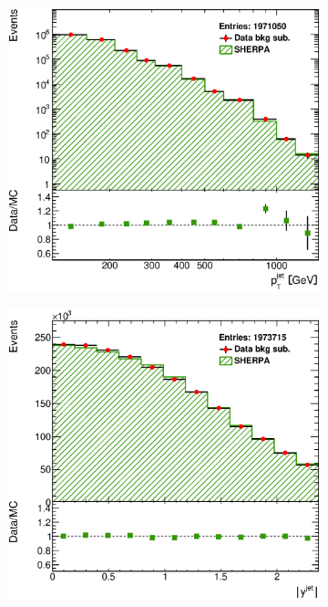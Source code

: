 \documentclass[12pt, twoside]{article}
\numberwithin{equation}{section}
\numberwithin{figure}{section}
\newenvironment{changemargin}[2]{%
\begin{list}{}{%
\setlength{\topsep}{0pt}%
\setlength{\leftmargin}{#1}%
\setlength{\rightmargin}{#2}%
\setlength{\listparindent}{\parindent}%
\setlength{\itemindent}{\parindent}%
\setlength{\parsep}{\parskip}%
}%
\item[]}{\end{list}}
\begin{document}
\begin{figure}
\begin{changemargin}{-1.0cm}{-0.75cm}
\begin{changemargin}{-0.75cm}{-1.0cm}
        \vspace{0.2cm}
        \begin{subfigure}[b]{0.37\textwidth}
            \includegraphics[width=\textwidth]{./images/BackgroundSubtractedSherpa/SIG_EVENTS-104.eps}
            \subcaption{}
            \label{fig:BSPtJetSHERPA}
        \end{subfigure}
        \begin{subfigure}[b]{0.37\textwidth}
            \includegraphics[width=\textwidth]{./images/BackgroundSubtractedSherpa/SIG_EVENTS-105.eps}

\end{subfigure}
\end{changemargin}
\end{changemargin}
\end{figure}
\end{document}
